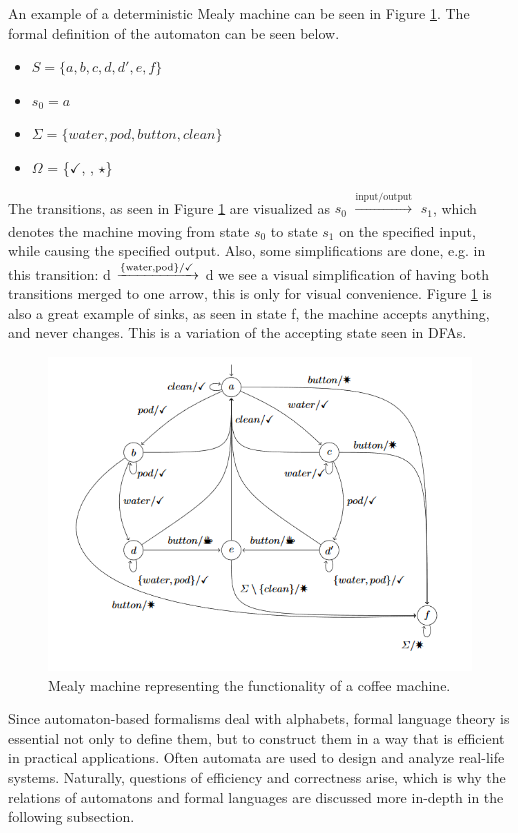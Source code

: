 \begin{example}
	\label{ex:coffeemealy}
	An example of a deterministic Mealy machine can be seen in Figure \ref{fig:coffeemealy}. The formal definition of the automaton can be seen below.
	\begin{itemize} 
		\item $S = \{a, b, c, d, d', e, f\}$ 
		\item $s_0 = a$
		\item $\Sigma = \{water, pod, button, clean\}$
		\item $\Omega$ = \{$\checkmark$, \Coffeecup, $\star$\}
	\end{itemize}
	The transitions, as seen in Figure \ref{fig:coffeemealy} are visualized as $s_0$ $\xrightarrow[]{\text{input/output}}$ $s_1$, which denotes the machine moving from state $s_0$ to state $s_1$ on the specified input, while causing the specified output. Also, some simplifications are done, e.g. in this transition: d $\xrightarrow[]{\text{\{water,pod\}/\checkmark}}$ d we see a visual simplification of having both transitions merged to one arrow, this is only for visual convenience. Figure \ref{fig:coffeemealy} is also a great example of sinks, as seen in state f, the machine accepts anything, and never changes. This is a variation of the accepting state seen in DFAs.
\end{example}

\begin{figure}[!ht]
	\centering
	\includegraphics[width=0.7\linewidth]{figures/coffeemealy}
	\caption{Mealy machine representing the functionality of a coffee machine.\cite{Steffen2011}}
	\label{fig:coffeemealy}
\end{figure}

Since automaton-based formalisms deal with alphabets, formal language theory is essential not only to define them, but to construct them in a way that is efficient in practical applications. Often automata are used to design and analyze real-life systems. Naturally, questions of efficiency and correctness arise, which is why the relations of automatons and formal languages are discussed more in-depth in the following subsection.

